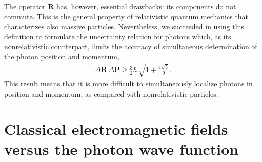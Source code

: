 \documentclass[onecolumn,aps,pra,12pt]{revtex4-1}
\begin{document}
The operator ${\bm R}$ has, however, essential drawbacks: its components do not commute. This is the general property of relativistic quantum mechanics that characterizes also massive particles.
Nevertheless, we succeeded in using this definition \cite{hur} to formulate the uncertainty relation for photons which, as its nonrelativistic counterpart, limits the accuracy of simultaneous determination of the photon position and momentum,
\begin{align}\label{phur}
\Delta{\bm R}\,\Delta{\bm P}\ge\frac{3}{2}\hbar\,\sqrt{1+\frac{4\sqrt{5}}{9}}.
\end{align}
This result means that it is more difficult to simultaneously localize photons in position and momentum, as compared with nonrelativistic particles.

\section{Classical electromagnetic fields\\versus
the photon wave function}
\end{document}
